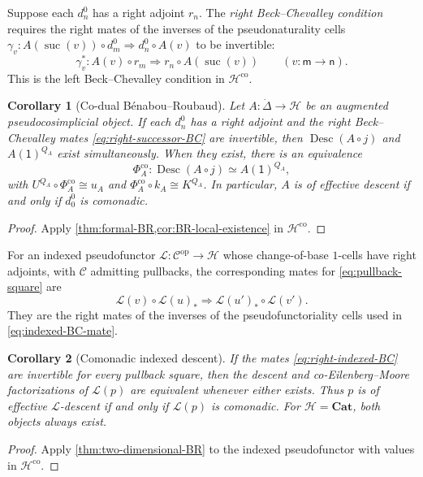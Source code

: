 \documentclass[11pt,a4paper]{article}
\numberwithin{equation}{section}
\newtheorem{corollary}[corollary]{Corollary}
\theoremstyle{definition}
\theoremstyle{remark}
\newcommand{\Hcat}{\mathcal H}
\newcommand{\C}{\mathcal C}
\newcommand{\Lx}{\mathcal L}
\newcommand{\Cat}{\mathbf{Cat}}
\newcommand{\Desc}{\operatorname{Desc}}
\newcommand{\suc}{\operatorname{suc}}
\begin{document}
Suppose each $d_n^0$ has a right adjoint $r_n$.
The \emph{right Beck--Chevalley condition} requires the right mates
of the inverses of the pseudonaturality cells
$\gamma_v\colon A(\suc(v))\circ d_m^0\Rightarrow d_n^0\circ A(v)$
to be invertible:
\begin{equation}
  \gamma_v^*\colon A(v)\circ r_m\Longrightarrow
  r_n\circ A(\suc(v))\qquad(v\colon\mathsf m\to\mathsf n).
  \label{eq:right-successor-BC}
\end{equation}
This is the left Beck--Chevalley condition in $\Hcat^{\mathrm{co}}$.

\begin{corollary}[Co-dual B\'enabou--Roubaud]
\label{thm:codual-BR}
Let $A\colon\dot\Delta\to\Hcat$ be an augmented pseudocosimplicial
object. If each $d_n^0$ has a right adjoint and the right
Beck--Chevalley mates \eqref{eq:right-successor-BC} are invertible,
then $\Desc(A\circ j)$ and
$A(\mathsf1)^{Q_A}$ exist simultaneously. When they exist, there is an
equivalence
\begin{equation}
  \Phi_A^{\mathrm{co}}\colon\Desc(A\circ j)\simeq A(\mathsf1)^{Q_A},
  \label{eq:codual-BR-equivalence}
\end{equation}
with $U^{Q_A}\circ\Phi_A^{\mathrm{co}}\cong u_A$ and
$\Phi_A^{\mathrm{co}}\circ k_A\cong K^{Q_A}$.
In particular, $A$ is of effective descent if and only if $d_0^0$
is comonadic.
\end{corollary}
\begin{proof}
Apply \cref{thm:formal-BR,cor:BR-local-existence} in
$\Hcat^{\mathrm{co}}$.
\end{proof}

For an indexed pseudofunctor $\Lx\colon\C^{\mathrm{op}}\to\Hcat$
whose change-of-base $1$-cells have right adjoints, with $\C$ admitting
pullbacks, the corresponding
mates for \eqref{eq:pullback-square} are
\begin{equation}
  \Lx(v)\circ\Lx(u)_*\Longrightarrow
  \Lx(u')_*\circ\Lx(v').
  \label{eq:right-indexed-BC}
\end{equation}
They are the right mates of the inverses of the pseudofunctoriality
cells used in \eqref{eq:indexed-BC-mate}.

\begin{corollary}[Comonadic indexed descent]
\label{cor:comonadic-indexed-descent}
If the mates \eqref{eq:right-indexed-BC} are invertible for every
pullback square, then the descent and co-Eilenberg--Moore
factorizations of $\Lx(p)$ are equivalent whenever either exists.
Thus $p$ is of effective $\Lx$-descent if and only if $\Lx(p)$ is
comonadic. For $\Hcat=\Cat$, both objects always exist.
\end{corollary}
\begin{proof}
Apply \cref{thm:two-dimensional-BR} to the indexed pseudofunctor
with values in $\Hcat^{\mathrm{co}}$.
\end{proof}
\end{document}
